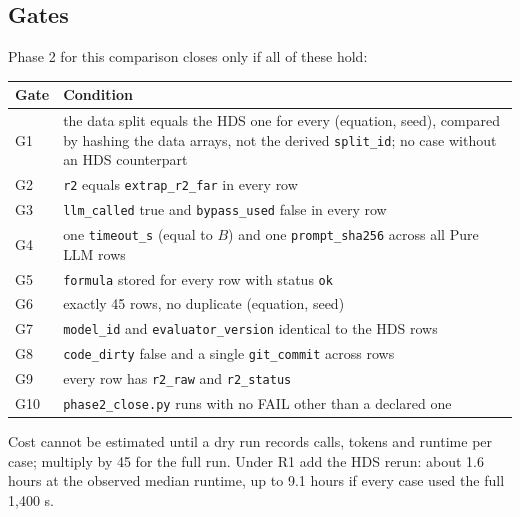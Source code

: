 \documentclass[11pt,a4paper]{article}
\newcommand{\code}[1]{\texttt{#1}}
\begin{document}
\subsection*{Gates}
Phase 2 for this comparison closes only if all of these hold:
\begin{center}\small
\begin{tabularx}{\textwidth}{@{}l X@{}}
\toprule
Gate & Condition \\
\midrule
G1 & the data split equals the HDS one for every (equation, seed), compared by hashing the data arrays, not the derived \code{split\_id}; no case without an HDS counterpart \\
G2 & \code{r2} equals \code{extrap\_r2\_far} in every row \\
G3 & \code{llm\_called} true and \code{bypass\_used} false in every row \\
G4 & one \code{timeout\_s} (equal to $B$) and one \code{prompt\_sha256} across all Pure LLM rows \\
G5 & \code{formula} stored for every row with status \code{ok} \\
G6 & exactly 45 rows, no duplicate (equation, seed) \\
G7 & \code{model\_id} and \code{evaluator\_version} identical to the HDS rows \\
G8 & \code{code\_dirty} false and a single \code{git\_commit} across rows \\
G9 & every row has \code{r2\_raw} and \code{r2\_status} \\
G10 & \code{phase2\_close.py} runs with no FAIL other than a declared one \\
\bottomrule
\end{tabularx}
\end{center}
Cost cannot be estimated until a dry run records calls, tokens and runtime per case; multiply by 45 for the full run. Under R1 add the HDS rerun: about 1.6 hours at the observed median runtime, up to 9.1 hours if every case used the full 1,400 s.

\end{document}
